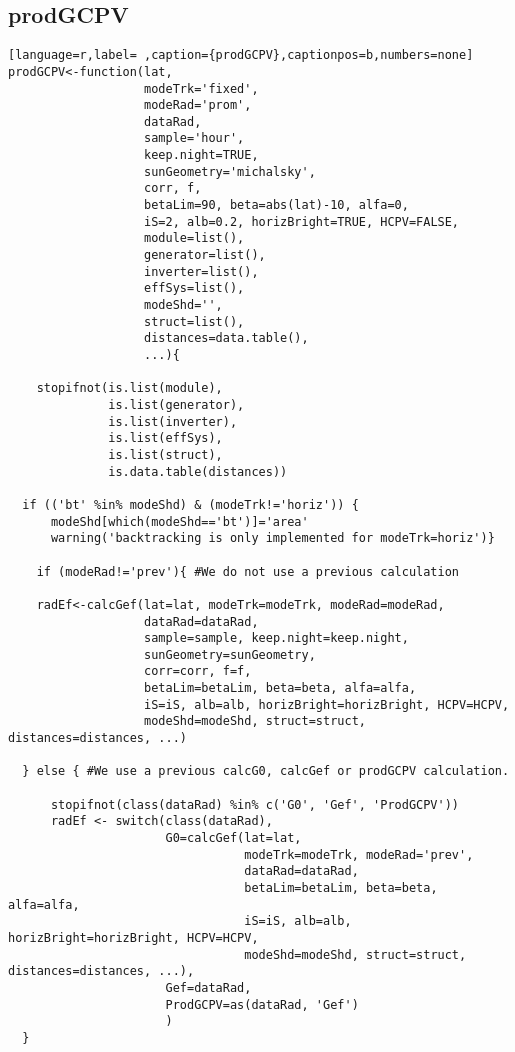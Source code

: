 \subsection{prodGCPV}
\label{sec:orgc82b807}
\label{subsec:prodgcpv}
\begin{lstlisting}[language=r,label= ,caption={prodGCPV},captionpos=b,numbers=none]
prodGCPV<-function(lat,
                   modeTrk='fixed', 
                   modeRad='prom',
                   dataRad,
                   sample='hour',
                   keep.night=TRUE,
                   sunGeometry='michalsky',
                   corr, f,
                   betaLim=90, beta=abs(lat)-10, alfa=0,
                   iS=2, alb=0.2, horizBright=TRUE, HCPV=FALSE,
                   module=list(), 
                   generator=list(),
                   inverter=list(), 
                   effSys=list(), 
                   modeShd='',    
                   struct=list(), 
                   distances=data.table(),
                   ...){

    stopifnot(is.list(module),
              is.list(generator),
              is.list(inverter),
              is.list(effSys),
              is.list(struct),
              is.data.table(distances))

  if (('bt' %in% modeShd) & (modeTrk!='horiz')) {
      modeShd[which(modeShd=='bt')]='area'
      warning('backtracking is only implemented for modeTrk=horiz')}

    if (modeRad!='prev'){ #We do not use a previous calculation

    radEf<-calcGef(lat=lat, modeTrk=modeTrk, modeRad=modeRad,
                   dataRad=dataRad,
                   sample=sample, keep.night=keep.night,
                   sunGeometry=sunGeometry,
                   corr=corr, f=f,
                   betaLim=betaLim, beta=beta, alfa=alfa,
                   iS=iS, alb=alb, horizBright=horizBright, HCPV=HCPV,
                   modeShd=modeShd, struct=struct, distances=distances, ...)

  } else { #We use a previous calcG0, calcGef or prodGCPV calculation.

      stopifnot(class(dataRad) %in% c('G0', 'Gef', 'ProdGCPV'))
      radEf <- switch(class(dataRad),
                      G0=calcGef(lat=lat,
                                 modeTrk=modeTrk, modeRad='prev',
                                 dataRad=dataRad,
                                 betaLim=betaLim, beta=beta, alfa=alfa,
                                 iS=iS, alb=alb, horizBright=horizBright, HCPV=HCPV,
                                 modeShd=modeShd, struct=struct, distances=distances, ...),
                      Gef=dataRad,
                      ProdGCPV=as(dataRad, 'Gef')
                      )
  }



\end{lstlisting}
